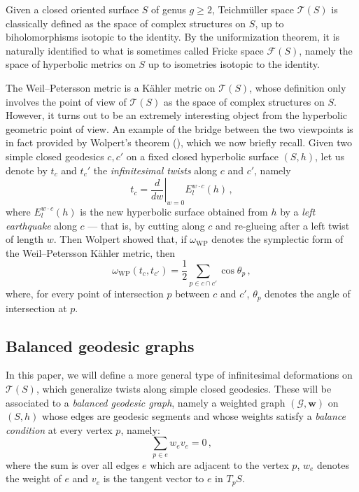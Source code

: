 \documentclass[11pt]{article}
\theoremstyle{definition}
\numberwithin{equation}{section}
\numberwithin{figure}{section}
\numberwithin{table}{section}
\newcommand{\Teich}{\mathcal{T}}
\newcommand{\weil}{{\mathrm{W}\!\mathrm{P}}}
\begin{document}
Given a closed oriented surface $S$ of genus $g\geq 2$, Teichm\"uller space $\Teich(S)$ is classically defined as the space of complex structures on $S$, up to biholomorphisms isotopic to the identity. By the uniformization theorem, it is naturally identified to what is sometimes called Fricke space $\mathcal F(S)$, namely the space of hyperbolic metrics on $S$ up to isometries isotopic to the identity.

The Weil--Petersson metric is a K\"ahler metric on $\Teich(S)$, whose definition only involves the point of view of $\Teich(S)$ as the space of complex structures on $S$. However, it turns out to be an extremely interesting object from the hyperbolic geometric point of view. An example of the bridge between the two viewpoints is in fact provided by Wolpert's theorem (\cite{wolpertelementary,wolpertformula}), which we now briefly recall. Given two simple closed geodesics $c,c'$ on a fixed closed hyperbolic surface $(S,h)$, let us denote by $t_c$ and $t_c'$ the \emph{infinitesimal twists} along $c$ and $c'$, namely
\[
t_c=\left.\frac{d}{dw}\right|_{w=0}E_l^{w\cdot c}(h)\,,
\]
where $E_l^{w\cdot c}(h)$ is the new hyperbolic surface obtained from $h$ by a \emph{left earthquake} along $c$ --- that is, by cutting along $c$ and re-glueing after a left twist of length $w$. Then Wolpert showed that, if $\omega_\weil$ denotes the symplectic form of the Weil--Petersson K\"ahler metric, then
\begin{equation}\label{eq wolpert formula}
\omega_\weil(t_{c},t_{c'})=\frac{1}{2}\sum_{p\in c\cap c'}\cos \theta_p\,,
\end{equation}
where, for every point of intersection $p$ between $c$ and $c'$, $\theta_p$ denotes the angle of intersection at $p$.


\subsection{Balanced geodesic graphs}

In this paper, we will define a more general type of infinitesimal deformations on $\Teich(S)$, which generalize twists along simple closed geodesics. These will be associated to a \emph{balanced geodesic graph}, namely a weighted graph $(\mathcal G,\mathbf w)$ on $(S,h)$ whose edges are geodesic segments and whose weights satisfy a \emph{balance condition} at every vertex $p$, namely:
\begin{equation}\label{eq balance intro}
{\sum_{p\in e} w_{e} v_{e}}=0\,,
\end{equation}
where the sum is over all edges $e$ which are adjacent to the vertex $p$, $w_e$ denotes the weight of $e$ and $v_e$ is the tangent vector to $e$ in $T_p S$.
\end{document}
